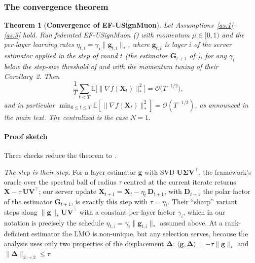 \documentclass{article}
\newtheorem{theorem}{Theorem}
\begin{document}
\subsubsection{The convergence theorem}

\begin{theorem}[\textbf{Convergence of EF-USignMuon}]\label{th:conv}
Let Assumptions~\ref{as:1}--\ref{as:3} hold. Run federated EF-USignMuon () with momentum $\mu \in [0,1)$ and the per-layer learning rates $\eta_{t,i} = \gamma_i \|\mathbf{g}_{t,i}\|_{*}$, where $\mathbf{g}_{t,i}$ is layer $i$ of the server estimator applied in the step of round $t$ (the estimator $\mathbf{G}_{t+1}$ of ), for any $\gamma_i$ below the step-size threshold of \citet[Theorem~19]{gruntkowska2025error} and with the momentum tuning of their Corollary~2. Then
\begin{equation}
\frac{1}{T}\sum_{t<T} \mathbb{E}\bigl[\|\nabla f(\mathbf{X}_t)\|_*^2\bigr] = \mathcal{O}\bigl(T^{-1/2}\bigr),
\end{equation}
and in particular $\min_{0\le t\le T} \mathbb{E}[\|\nabla f(\mathbf{X}_t)\|_*^2] = \mathcal{O}(T^{-1/2})$, as announced in the main text. The centralized  is the case $N=1$.
\end{theorem}

\paragraph{Proof sketch} Three checks reduce the theorem to \citet[Theorem~19]{gruntkowska2025error}.

\emph{The step is their step.} For a layer estimator $\mathbf{g}$ with SVD $\mathbf{U}\boldsymbol{\Sigma}\mathbf{V}^\top$, the framework's oracle over the spectral ball of radius $\tau$ centred at the current iterate returns $\mathbf{X} - \tau\,\mathbf{U}\mathbf{V}^\top$; our server update $\mathbf{X}_{t+1} = \mathbf{X}_t - \eta_t\,\mathbf{D}_{t+1}$, with $\mathbf{D}_{t+1}$ the polar factor of the estimator $\mathbf{G}_{t+1}$, is exactly this step with $\tau = \eta_t$. Their ``sharp'' variant steps along $\|\mathbf{g}\|_{*}\mathbf{U}\mathbf{V}^\top$ with a constant per-layer factor $\gamma_i$, which in our notation is precisely the schedule $\eta_{t,i} = \gamma_i\|\mathbf{g}_{t,i}\|_{*}$ assumed above. At a rank-deficient estimator the LMO is non-unique, but any selection serves, because the analysis uses only two properties of the displacement $\boldsymbol{\Delta}$: $\langle\mathbf{g},\boldsymbol{\Delta}\rangle = -\tau\|\mathbf{g}\|_{*}$ and $\|\boldsymbol{\Delta}\|_{2\to2}\le\tau$.
\end{document}
